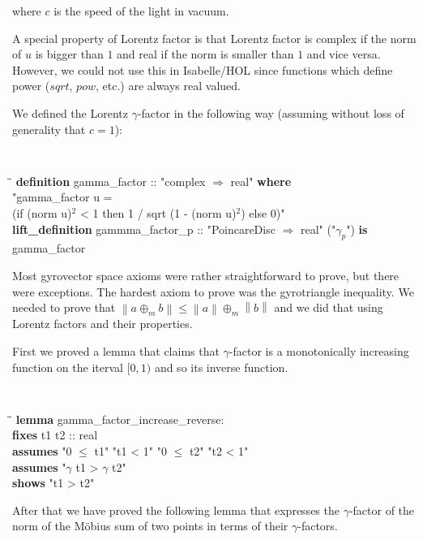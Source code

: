 \documentclass[a4paper]{article}
\newcommand{\tab}{\hspace{5mm}}
\theoremstyle{definition}
\newcommand{\norm}[1]{\left\lVert#1\right\rVert}
\begin{document}
\noindent where $c$ is the speed of the light in vacuum.

A special property of Lorentz factor is that Lorentz factor is complex
if the norm of $u$ is bigger than $1$ and real if the norm is smaller
than $1$ and vice versa. However, we could not use this in
Isabelle/HOL since functions which define power ($sqrt$, $pow$, etc.)
are always real valued.

We defined the Lorentz $\gamma$-factor in the following way (assuming
without loss of generality that $c=1$):


{\tt
\begin{small}
\begin{tabbing}
\tab\=\tab\=\kill
{\bf definition} gamma\_factor :: "complex $\Rightarrow$ real" {\bf where}\\
\> "gamma\_factor u = \\
\>\> (if (norm u)$^2$ < 1 then  1 / sqrt (1 - (norm u)$^2$) else 0)"\\
{\bf lift\_definition} gammma\_factor\_p :: "PoincareDisc $\Rightarrow$ real" ("$\gamma_p$") {\bf is}\\
\> gamma\_factor
\end{tabbing}
\end{small}
\tt}


Most gyrovector space axioms were rather straightforward to prove, but
there were exceptions. The hardest axiom to prove was the gyrotriangle
inequality. We needed to prove that
$\norm{a\oplus_m b} \leq \norm{a} \oplus_m \norm{b}$ and we did that
using Lorentz factors and their properties.

First we proved a lemma that claims that $\gamma$-factor is a
monotonically increasing function on the iterval $[0, 1)$ and so its
inverse function.

{\tt
\begin{small}
\begin{tabbing}
\tab\=\tab\=\kill
{\bf lemma} gamma\_factor\_increase\_reverse:\\
\>  {\bf fixes} t1 t2 :: real\\
\>  {\bf assumes} "0 $\leq$ t1" "t1 < 1" "0 $\leq$ t2" "t2 < 1"\\
\>  {\bf assumes} "$\gamma$ t1 > $\gamma$ t2"\\
\>  {\bf shows} "t1 > t2"
\end{tabbing}
\end{small}
}

After that we have proved the following lemma that expresses the
$\gamma$-factor of the norm of the M\"obius sum of two points in terms
of their $\gamma$-factors.
\end{document}
